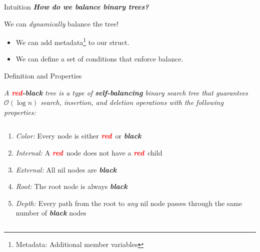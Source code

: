 \documentclass[aspectratio=169]{beamer}
\newcommand{\textib}[1]{\textit{\textbf{{#1}}}}
\newcommand{\red}{\textib{\textcolor{red}{red}}}
\newenvironment{define}{\begin{tcolorbox}[title={Definition}]\begin{small}}{\end{small}\end{tcolorbox}}
\begin{document}
\begin{frame}{Intuition}
    \textib{How do we balance binary trees?} \vspace{1em}

    \noindent We can \textit{dynamically} balance the tree!
    \begin{itemize}[label=$\to$]
        \item We can add metadata\footnote{Metadata: Additional member variables} to our
             struct.
        \item We can define a set of conditions that enforce balance.
    \end{itemize}
\end{frame}


\begin{frame}[label=def,fragile]{Definition and Properties}
    \begin{define}
        \it
        {
            A \red\textib{-black} tree is a type of \textib{self-balancing} binary
            search tree that guarantees $\mathcal{O}(\log n)$ search, insertion, and deletion operations
            with the following properties:
        }
    \end{define}
    \begin{columns}
        \begin{column}{.5\textwidth}
            \begin{adjustbox}{valign=T, minipage=[t]{\textwidth}}
                \begin{enumerate}[label=\textit{(\roman*)}]
                    \item<1> \textit{Color:} Every node is either \red \ or \textib{black}
                    \item<2> \textit{Internal:} A \red \ node does not have a \red \ child
                    \item<3> \textit{External:} All nil nodes are \textib{black}
                    \item<4> \textit{Root:} The root node is always \textib{black}
                    \item<5> \textit{Depth:} Every path from the root to \textit{any} nil node
                        passes through the same number of \textib{black} nodes
                \end{enumerate}
            \end{adjustbox}
        \end{column}

        \begin{column}{.5\textwidth}
        \end{column}
    \end{columns}
\end{frame}
\end{document}
